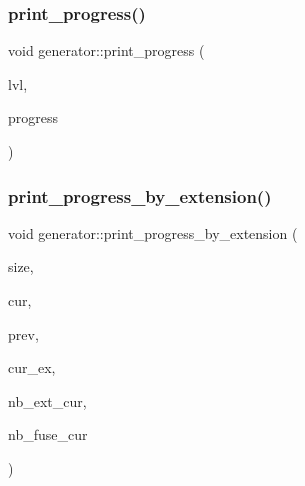 \mbox{\label{classgenerator_a3948b1b2e2b9e395bb940b3d804edcbd}} 
\subsubsection{\texorpdfstring{print\+\_\+progress()}{print\_progress()}\hspace{0.1cm}{\footnotesize\ttfamily [2/2]}}
{\footnotesize\ttfamily void generator\+::print\+\_\+progress (\begin{DoxyParamCaption}\item[{\mbox{\hyperlink{galois_8h_a09fddde158a3a20bd2dcadb609de11dc}{I\+NT}}}]{lvl,  }\item[{double}]{progress }\end{DoxyParamCaption})}

\mbox{\label{classgenerator_a027dc8a7d19a8bfd6cf3ecaab3878ec5}} 
\subsubsection{\texorpdfstring{print\+\_\+progress\+\_\+by\+\_\+extension()}{print\_progress\_by\_extension()}}
{\footnotesize\ttfamily void generator\+::print\+\_\+progress\+\_\+by\+\_\+extension (\begin{DoxyParamCaption}\item[{\mbox{\hyperlink{galois_8h_a09fddde158a3a20bd2dcadb609de11dc}{I\+NT}}}]{size,  }\item[{\mbox{\hyperlink{galois_8h_a09fddde158a3a20bd2dcadb609de11dc}{I\+NT}}}]{cur,  }\item[{\mbox{\hyperlink{galois_8h_a09fddde158a3a20bd2dcadb609de11dc}{I\+NT}}}]{prev,  }\item[{\mbox{\hyperlink{galois_8h_a09fddde158a3a20bd2dcadb609de11dc}{I\+NT}}}]{cur\+\_\+ex,  }\item[{\mbox{\hyperlink{galois_8h_a09fddde158a3a20bd2dcadb609de11dc}{I\+NT}}}]{nb\+\_\+ext\+\_\+cur,  }\item[{\mbox{\hyperlink{galois_8h_a09fddde158a3a20bd2dcadb609de11dc}{I\+NT}}}]{nb\+\_\+fuse\+\_\+cur }\end{DoxyParamCaption})}

